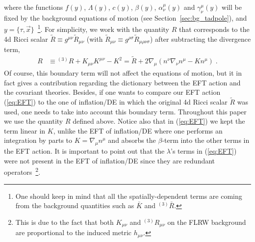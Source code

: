 \documentclass[a4paper,11pt]{article}
\numberwithin{equation}{section}
\begin{document}
where the functions $f(y)$, $\Lambda(y)$, $c(y)$, $\beta(y)$, $\alpha^\mu_\nu(y)$ and $\gamma^\mu_\nu(y)$ will be fixed by the background equations of motion (see Section~\ref{sec:bg_tadpole}), and $y = \{\tau, \vec{x}\}$~\footnote{One should keep in mind that all the spatially-dependent terms are coming from the background quantities such as $\bar{K}$ and ${}^{(3)}\!\bar{R}$.}. For simplicity, we work with the quantity $R$ that corresponds to the 4d Ricci scalar $\tilde{R} \equiv g^{\mu\nu}\tilde{R}_{\mu\nu}$ (with $\tilde{R}_{\mu\nu}\equiv g^{\rho\sigma}\tilde{R}_{\mu\rho\nu\sigma}$) after subtracting the divergence term,
\begin{align} \label{eqn:def-R}
R &\equiv {}^{(3)}\!R + K_{\mu\nu}K^{\mu\nu} - K^2 = \tilde{R} + 2\nabla_\mu(n^\nu\nabla_\nu n^\mu - K n^\mu)\;.
\end{align}
Of course, this boundary term will not affect the equations of motion, but it in fact gives a contribution regarding the dictionary between the EFT action and the covariant theories. Besides, if one wants to compare our EFT action (\ref{eq:EFT}) to the one of inflation/DE in which the original 4d Ricci scalar $\tilde{R}$ was used, one needs to take into account this boundary term. Throughout this paper we use the quantity $R$ defined above. Notice also that in (\ref{eq:EFT}) we kept the term linear in $K$, unlike the EFT of inflation/DE where one performs an integration by parts to $K = \nabla_\mu n^\mu$ and absorbs the $\beta$-term into the other terms in the EFT action. It is important to point out that the $\lambda$'s terms in (\ref{eq:EFT}) were not present in the EFT of inflation/DE since they are redundant operators~\footnote{This is due to the fact that both $K_{\mu\nu}$ and ${}^{(3)}\!R_{\mu\nu}$ on the FLRW background are proportional to the induced metric $h_{\mu\nu}$.}. 
\end{document}
